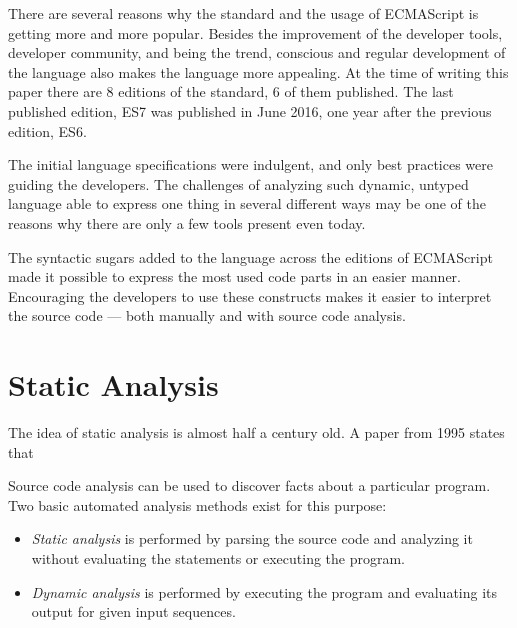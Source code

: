 There are several reasons why the standard and the usage of ECMAScript is getting more and more popular. Besides the improvement of the developer tools, developer community, and being the trend, conscious and regular development of the language also makes the language more appealing. At the time of writing this paper there are 8 editions of the standard, 6 of them published. The last published edition, ES7 was published in June 2016, one year after the previous edition, ES6.

The initial language specifications were indulgent, and only best practices were guiding the developers. The challenges of analyzing such dynamic, untyped language able to express one thing in several different ways may be one of the reasons why there are only a few tools present even today.

The syntactic sugars added to the language across the editions of ECMAScript made it possible to express the most used code parts in an easier manner. Encouraging the developers to use these constructs makes it easier to interpret the source code --- both manually and with source code analysis.



\section{Static Analysis}
The idea of static analysis is almost half a century old. A paper from 1995 states that 

Source code analysis can be used to discover facts about a particular program. Two basic automated analysis methods exist for this purpose:
\begin{itemize}[topsep=0pt]
  \item \emph{Static analysis} is performed by parsing the source code and analyzing it without evaluating the statements or executing the program.
  \item \emph{Dynamic analysis} is performed by executing the program and evaluating its output for given input sequences.
\end{itemize}

